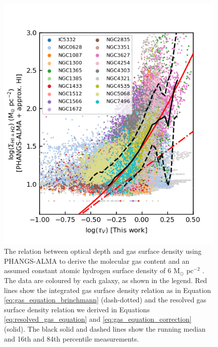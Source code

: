 \documentclass[fleqn,usenatbib]{mnras}
\begin{document}
\begin{figure}
    \centering
    \includegraphics[width=\columnwidth]{figures/fig8.png}
    \caption{The relation between optical depth and gas surface density using PHANGS-ALMA to derive the molecular gas content and an assumed constant atomic hydrogen surface density of 6 M$_{\odot}$ pc$^{-2}$ \citep{leroy2021}. The data are coloured by each galaxy, as shown in the legend. Red lines show the integrated gas surface density relation as in Equation \ref{eq:gas_equation_brinchmann} (dash-dotted) and the resolved gas surface density relation we derived in Equations \ref{eq:resolved_gas_equation} and \ref{eq:gas_equation_correction} (solid). The black solid and dashed lines show the running median and 16th and 84th percentile measurements. }
    \label{fig:MUSE_optical_depth_comparison_PHANGS_ALMA}
\end{figure}
\end{document}
